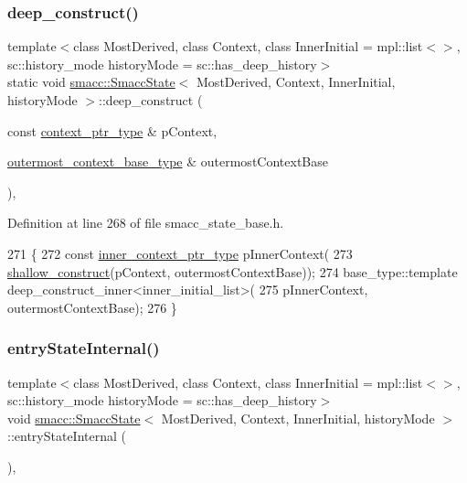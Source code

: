 \subsubsection{\texorpdfstring{deep\+\_\+construct()}{deep\_construct()}}
{\footnotesize\ttfamily template$<$class Most\+Derived, class Context, class Inner\+Initial = mpl\+::list$<$$>$, sc\+::history\+\_\+mode history\+Mode = sc\+::has\+\_\+deep\+\_\+history$>$ \\
static void \hyperlink{classsmacc_1_1SmaccState}{smacc\+::\+Smacc\+State}$<$ Most\+Derived, Context, Inner\+Initial, history\+Mode $>$\+::deep\+\_\+construct (\begin{DoxyParamCaption}\item[{const \hyperlink{classsmacc_1_1SmaccState_a0e15b77514301039f6bc093a9d3f6425}{context\+\_\+ptr\+\_\+type} \&}]{p\+Context,  }\item[{\hyperlink{classsmacc_1_1SmaccState_aaf76bbe2aa9dd73e3284605f84ab4b16}{outermost\+\_\+context\+\_\+base\+\_\+type} \&}]{outermost\+Context\+Base }\end{DoxyParamCaption})\hspace{0.3cm}{\ttfamily [inline]}, {\ttfamily [static]}}



Definition at line 268 of file smacc\+\_\+state\+\_\+base.\+h.


\begin{DoxyCode}
271   \{
272     \textcolor{keyword}{const} \hyperlink{classsmacc_1_1SmaccState_a65a772c2e2039e9a59148ba6ffb54d8a}{inner\_context\_ptr\_type} pInnerContext(
273         \hyperlink{classsmacc_1_1SmaccState_a1dccb401e1a99031863a21a590d953e6}{shallow\_construct}(pContext, outermostContextBase));
274     base\_type::template deep\_construct\_inner<inner\_initial\_list>(
275         pInnerContext, outermostContextBase);
276   \}
\end{DoxyCode}
\mbox{\label{classsmacc_1_1SmaccState_a084b95d0cb856d048fdb5ce81400eec7}} 
\subsubsection{\texorpdfstring{entry\+State\+Internal()}{entryStateInternal()}}
{\footnotesize\ttfamily template$<$class Most\+Derived, class Context, class Inner\+Initial = mpl\+::list$<$$>$, sc\+::history\+\_\+mode history\+Mode = sc\+::has\+\_\+deep\+\_\+history$>$ \\
void \hyperlink{classsmacc_1_1SmaccState}{smacc\+::\+Smacc\+State}$<$ Most\+Derived, Context, Inner\+Initial, history\+Mode $>$\+::entry\+State\+Internal (\begin{DoxyParamCaption}{ }\end{DoxyParamCaption})\hspace{0.3cm}{\ttfamily [inline]}, {\ttfamily [private]}}



